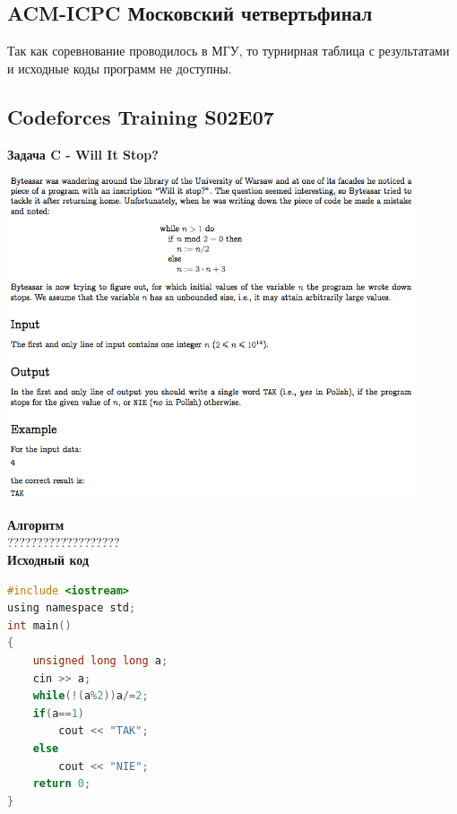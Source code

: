 \documentclass[a4paper,12pt]{article}
\begin{document}
%
%
\newpage
\subsection{ACM-ICPC Московский четвертьфинал}

Так как соревнование проводилось в МГУ, то турнирная таблица с результатами и исходные коды программ не доступны. \\



%
%
\newpage
\subsection{Codeforces Training S02E07}

\textbf{{\large Задача C - Will It Stop?}} \\
\begin{center}
\includegraphics[width=0.9\textwidth]{CT_S02E07/CT_S02E07_C.png}\\ [1cm]
\end{center}
\textbf{{\large Алгоритм}} \\
{\Huge ???????????????????} \\ 

\textbf{{\large Исходный код}}
\begin{lstlisting}[language=C]
#include <iostream>
using namespace std;
int main()
{
    unsigned long long a;
    cin >> a;
    while(!(a%2))a/=2;
    if(a==1)
        cout << "TAK";
    else
        cout << "NIE";
    return 0;
}
\end{lstlisting}
\end{document}
